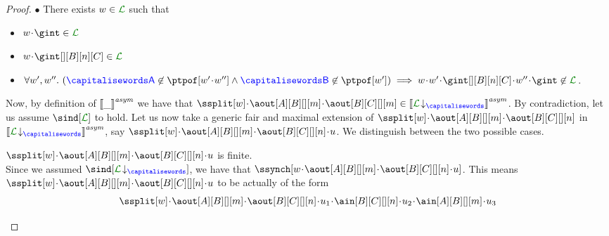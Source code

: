 \begin{proof}
%
%
$\bullet$ There exists $\acword\in\clang$ such that 
\begin{itemize}
\item
$\acword\cat\gint\in\clang$
\item
$\acword\cat\gint[][B][n][C]\in\clang$
\item
$\forall \acword', \acword''.\  (\p\not\in\ptpof[\acword'\cat\acword''] \land \q\not\in\ptpof[\acword']) \implies \acword\cat\acword'\cat\gint[][B][n][C]\cat\acword''\cat\gint\not\in\clang$.
 \end{itemize}
Now, by definition of ${\llbracket \_ \rrbracket}^{\textit{asym}}$
we have that $\ssplit[\acword]\cat\aout[A][B][][m]\cat\aout[B][C][][m]\in\asem{\proj{\clang}{}}$.
By contradiction, let us assume $\sind[\clang]$ to hold.
Let us now take a generic fair and maximal extension  of $\ssplit[\acword]\cat\aout[A][B][][m]\cat\aout[B][C][][n]$
in $\asem{\proj{\clang}{}}$, say  $\ssplit[\acword]\cat\aout[A][B][][m]\cat\aout[B][C][][n]\cat u$. We distinguish between the two possible cases.
\begin{description}
\item
$\ssplit[\acword]\cat\aout[A][B][][m]\cat\aout[B][C][][n]\cat u$ is finite.\\
Since we assumed $\sind[\proj{\clang}{}]$, we have that 
$\ssynch[{\acword\cat\aout[A][B][][m]\cat\aout[B][C][][n]\cat u}]$.
This means  $\ssplit[\acword]\cat\aout[A][B][][m]\cat\aout[B][C][][n]\cat u$  to be actually
of the form  
$$\ssplit[\acword]\cat\aout[A][B][][m]\cat\aout[B][C][][n]\cat u_1\cat\ain[B][C][][n]\cat u_2\cat\ain[A][B][][m]\cat u_3$$

\end{description}
\end{proof}
